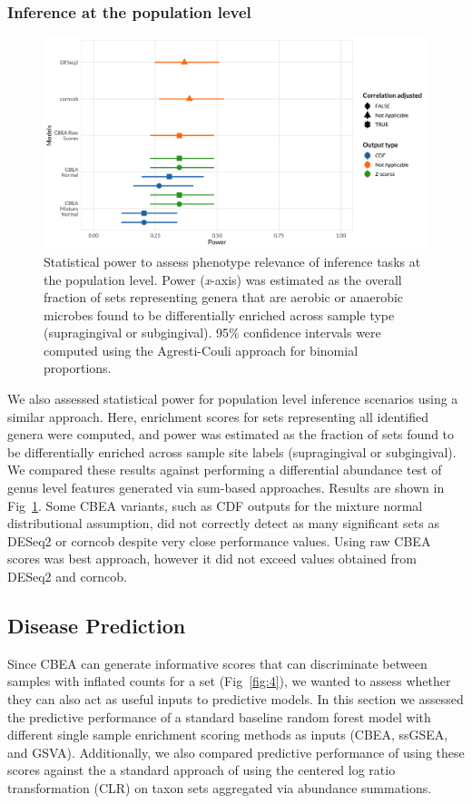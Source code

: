 \documentclass[10pt,letterpaper]{article}
\begin{document}
\subsubsection*{Inference at the population level}
\begin{figure}[!h]
    \centering
    \includegraphics[width = \textwidth]{figures/data_diffab_pwr.png}
    \caption{Statistical power to assess phenotype relevance of inference tasks at the population level. Power (\emph{x}-axis) was estimated as the overall fraction of sets representing genera that are aerobic or anaerobic microbes found to be differentially enriched across sample type (supragingival or subgingival). 95\% confidence intervals were computed using the Agresti-Couli approach for binomial proportions.}  
    \label{fig:5}
\end{figure}

We also assessed statistical power for population level inference scenarios using a similar approach. Here, enrichment scores for sets representing all identified genera were computed, and power was estimated as the fraction of sets found to be differentially enriched across sample site labels (supragingival or subgingival). We compared these results against performing a differential abundance test of genus level features generated via sum-based approaches. Results are shown in Fig~\ref{fig:5}. Some CBEA variants, such as CDF outputs for the mixture normal distributional assumption, did not correctly detect as many significant sets as DESeq2 or corncob despite very close performance values. Using raw CBEA scores was best approach, however it did not exceed values obtained from DESeq2 and corncob. 

\subsection*{Disease Prediction}   
Since CBEA can generate informative scores that can discriminate between samples with inflated counts for a set (Fig~\ref{fig:4}), we wanted to assess whether they can also act as useful inputs to predictive models. In this section we assessed the predictive performance of a standard baseline random forest model \cite{breiman2001} with different single sample enrichment scoring methods as inputs (CBEA, ssGSEA, and GSVA). Additionally, we also compared predictive performance of using these scores against the a standard approach of using the centered log ratio transformation (CLR) on taxon sets aggregated via abundance summations.     
\end{document}
